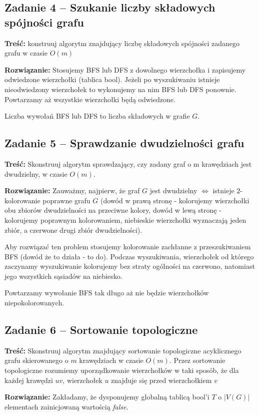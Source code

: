 \subsection{Zadanie 4 -- Szukanie liczby składowych spójności grafu}
\textbf{Treść: } konstruuj algorytm znajdujący liczbę składowych 
spójności zadanego grafu w czasie $O(m)$

\textbf{Rozwiązanie: } Stosujemy BFS lub DFS z dowolnego 
wierzchołka i zapisujemy odwiedzone wierzchołki (tablica bool).
Jeżeli po wyszukiwaniu istnieje nieodwiedzony wierzchołek to 
wykonujemy na nim BFS lub DFS ponownie. Powtarzamy aż
wszystkie wierzchołki będą odwiedzone. 

Liczba wywołań BFS lub DFS to liczba składowych w grafie $G$.

\subsection{Zadanie 5 -- Sprawdzanie dwudzielności grafu}
\textbf{Treść: } Skonstruuj algorytm sprawdzający, 
czy zadany graf o m krawędziach jest dwudzielny, w czasie $O(m)$.

\textbf{Rozwiązanie: } Zauważmy, najpierw, że 
graf $G$ jest dwudzielny $\Leftrightarrow$ istnieje $2$-kolorowanie
poprawne grafu $G$ (dowód w prawą stronę - kolorujemy 
wierzchołki obu zbiorów dwudzielności na przeciwne kolory, dowód 
w lewą stronę - kolorujemy poprawnym kolorowaniem, niebieskie
wierzchołki wyznaczają jeden zbiór, a czerwone drugi zbiór dwudzielności). 

Aby rozwiązać ten problem stosujemy kolorowanie 
zachłanne z przeszukiwaniem BFS (dowód że to działa - to do). 
Podczas wyszukiwania, wierzchołek od którego zaczynamy 
wyszukiwanie kolorujemy 
bez straty ogólności na czerwono, natomiast jego
wszystkich sąsiadów na niebiesko.

Powtarzamy wywołanie BFS tak długo aż nie będzie 
wierzchołków niepokolorowanych.

\subsection{Zadanie 6 -- Sortowanie topologiczne}
\textbf{Treść: } Skonstruuj algorytm znajdujący 
sortowanie topologiczne acyklicznego grafu skierowanego 
o $m$ krawędziach w czasie $O(m)$. 
Przez sortowanie topologiczne rozumiemy uporządkowanie 
wierzchołków w taki sposób, że dla
każdej krawędzi $uv$, wierzchołek $u$ znajduje się przed 
wierzchołkiem $v$

\textbf{Rozwiązanie:} Zakładamy, że dysponujemy globalną
tablicą bool'i $T$ o $|V(G)|$ elementach zainicjowaną wartością 
\textit{false}.

